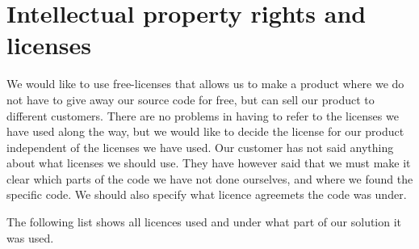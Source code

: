 
\section{Intellectual property rights and  licenses}
We would like to use free-licenses that allows us to make a product where we do not have to give away our source code for free, but can sell our product to different customers. There are no problems in having to refer to the licenses we have used along the way, but we would like to decide the license for our product independent of the licenses we have used. 
\newline
\newline
Our customer has not said anything about what licenses we should use. They have however said that we must make it clear which parts of the code we have not done ourselves, and where we found the specific code. We should also specify what licence agreemets the code was under. 

\newpage
The following list shows all licences used and under what part of our solution it was used.

